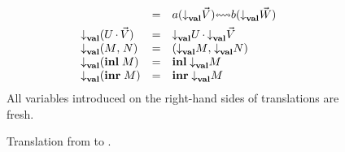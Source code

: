 \begin{figure*}
\begin{mdframed}
\begin{highlight}
\[\begin{array}{lcl}
        & = & \gvBuf{a}{\atv{\gvVec{V}}}{b}{\atv{\gvVec{W}}}
        \\[1ex]
        \atv{\parens{U\gvVecAdd\gvVec{V}}}
        & = & \atv{U}\gvVecAdd\atv{\gvVec{V}}
        \\
        \atv{\gvPair{M}{N}}
        & = & \gvPair{\atv{M}}{\atv{N}}
        \\
        \atv{\parens{\gvInl{M}}}
        & = & \gvInl{\atv{M}}
        \\
        \atv{\parens{\gvInr{M}}}
        & = & \gvInr{\atv{M}}
      \end{array}
    \]
    All variables introduced on the right-hand sides of translations are fresh.
  \end{highlight}\end{mdframed}
  \caption{Translation from \affineEGV to \affineAGV.}
  \label{fig:affine-egv-to-agv}
\end{figure*}

